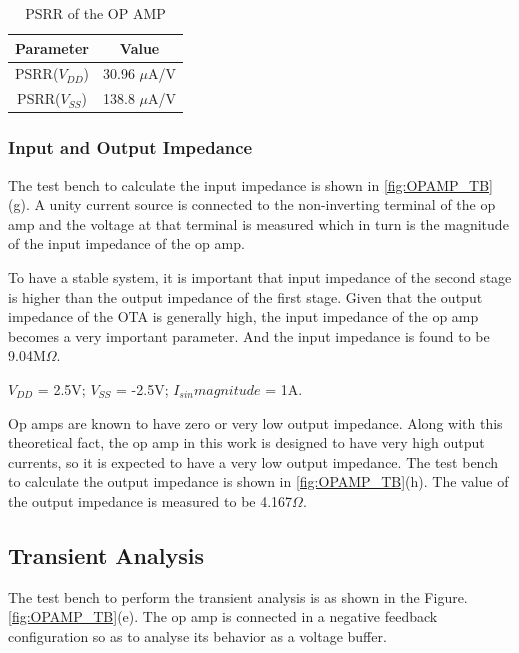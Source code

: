 \begin{table} [H]
\centering
\begin{tabular}{@{}cc@{}}
\toprule
Parameter					& Value				\\ \midrule
PSRR($V_{DD}$)				& 30.96 $\mu$A/V		\\
PSRR($V_{SS}$)				& 138.8 $\mu$A/V		\\
\bottomrule
\end{tabular}
\caption{PSRR of the OP AMP}
\label{tab:OPAMP_PSRR}
\end{table}

\subsubsection{Input and Output Impedance}
The test bench to calculate the input impedance is shown in \ref{fig:OPAMP_TB}(g). A unity current source is connected to the non-inverting terminal of the op amp and the voltage at that terminal is measured which in turn is the magnitude of the input impedance of the op amp.

To have a stable system, it is important that input impedance of the second stage is higher than the output impedance of the first stage. Given that the output impedance of the OTA is generally high, the input impedance of the op amp becomes a very important parameter. And the input impedance is found to be 9.04M$\Omega$.

$V_{DD}$ = 2.5V; $V_{SS}$ = -2.5V; $I_{sin} magnitude $ = 1A.

Op amps are known to have zero or very low output impedance. Along with this theoretical fact, the op amp in this work is designed to have very high output currents, so it is expected to have a very low output impedance. The test bench to calculate the output impedance is shown in \ref{fig:OPAMP_TB}(h). The value of the output impedance is measured to be 4.167$\Omega$.

\subsection{Transient Analysis}
The test bench to perform the transient analysis is as shown in the Figure.\ref{fig:OPAMP_TB}(e). The op amp is connected in a negative feedback configuration so as to analyse its behavior as a voltage buffer.

